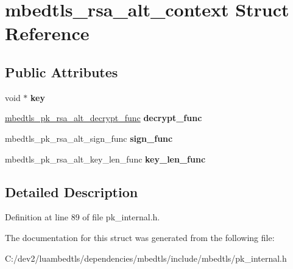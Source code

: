 \hypertarget{structmbedtls__rsa__alt__context}{\section{mbedtls\-\_\-rsa\-\_\-alt\-\_\-context Struct Reference}
\label{structmbedtls__rsa__alt__context}
}
\subsection*{Public Attributes}
\begin{DoxyCompactItemize}
\item 
\hypertarget{structmbedtls__rsa__alt__context_a3401cfe1ad6eda2011b67550b75c6cbe}{void $\ast$ {\bfseries key}}\label{structmbedtls__rsa__alt__context_a3401cfe1ad6eda2011b67550b75c6cbe}

\item 
\hypertarget{structmbedtls__rsa__alt__context_a9aeee8e7912780a2858957c6e9029190}{\hyperlink{pk_8h_af1d17481ef09075da6d435adc0be1d61}{mbedtls\-\_\-pk\-\_\-rsa\-\_\-alt\-\_\-decrypt\-\_\-func} {\bfseries decrypt\-\_\-func}}\label{structmbedtls__rsa__alt__context_a9aeee8e7912780a2858957c6e9029190}

\item 
\hypertarget{structmbedtls__rsa__alt__context_ac7ab4c3b43c032b0dd1dec664970594b}{mbedtls\-\_\-pk\-\_\-rsa\-\_\-alt\-\_\-sign\-\_\-func {\bfseries sign\-\_\-func}}\label{structmbedtls__rsa__alt__context_ac7ab4c3b43c032b0dd1dec664970594b}

\item 
\hypertarget{structmbedtls__rsa__alt__context_a5e93d75e2177a223d7909c426b85dac2}{mbedtls\-\_\-pk\-\_\-rsa\-\_\-alt\-\_\-key\-\_\-len\-\_\-func {\bfseries key\-\_\-len\-\_\-func}}\label{structmbedtls__rsa__alt__context_a5e93d75e2177a223d7909c426b85dac2}

\end{DoxyCompactItemize}


\subsection{Detailed Description}


Definition at line 89 of file pk\-\_\-internal.\-h.



The documentation for this struct was generated from the following file\-:\begin{DoxyCompactItemize}
\item 
C\-:/dev2/luambedtls/dependencies/mbedtls/include/mbedtls/pk\-\_\-internal.\-h\end{DoxyCompactItemize}
